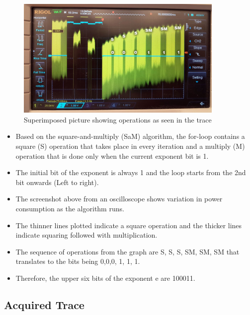 \documentclass[1p,16pt]{elsarticle}
\begin{document}
\begin{figure}[H]
	\centering
    \centerline{\includegraphics[width=10cm]{manual_extraction}}
    \caption{Superimposed picture showing operations as seen in the trace}\label{fig:manual_extraction}
\end{figure}
\begin{itemize}

\item Based on the square-and-multiply (SaM) algorithm, the for-loop contains a square (S) operation that takes place in every iteration and a multiply (M) operation that is done only when the current exponent bit is 1.

\item The initial bit of the exponent is always 1 and the loop starts from the 2nd bit onwards (Left to right).

\item The screenshot above from an oscilloscope shows variation in power consumption as the algorithm runs.

\item The thinner lines plotted indicate a square operation and the thicker lines indicate squaring followed with multiplication.

\item The sequence of operations from the graph are S, S, S, SM, SM, SM that translates to the bits being 0,0,0, 1, 1, 1.

\item Therefore, the upper six bits of the exponent e are 100011.

\end{itemize}


\subsection{Acquired Trace}%
\label{sub:acquired_trace}
\end{document}
